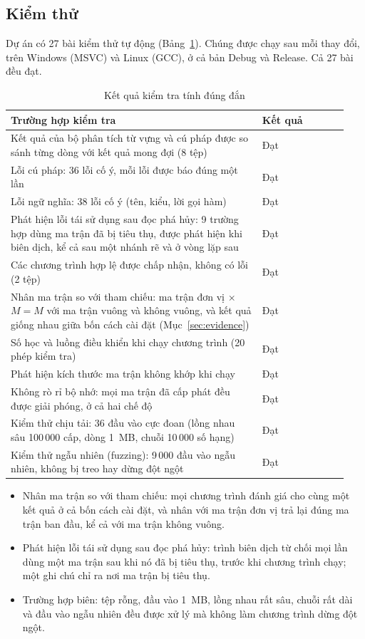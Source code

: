 \documentclass[a4paper]{article}
\begin{document}
	\subsection{Kiểm thử}

	Dự án có 27 bài kiểm thử tự động (Bảng~\ref{tab:verification}). Chúng được chạy sau mỗi thay đổi, trên Windows (MSVC) và Linux (GCC), ở cả bản Debug và Release. Cả 27 bài đều đạt.

	\begin{table}[h]
		\centering
		\caption{Kết quả kiểm tra tính đúng đắn}
		\label{tab:verification}
		\begin{tabular}{@{}>{\RaggedRight}p{0.70\linewidth} >{\RaggedRight}p{0.24\linewidth}@{}}
			\toprule
			Trường hợp kiểm tra & Kết quả \\
			\midrule
			Kết quả của bộ phân tích từ vựng và cú pháp được so sánh từng dòng với kết quả mong đợi (8 tệp) & Đạt \\
			Lỗi cú pháp: 36 lỗi cố ý, mỗi lỗi được báo đúng một lần & Đạt \\
			Lỗi ngữ nghĩa: 38 lỗi cố ý (tên, kiểu, lời gọi hàm) & Đạt \\
			Phát hiện lỗi tái sử dụng sau đọc phá hủy: 9 trường hợp dùng ma trận đã bị tiêu thụ, được phát hiện khi biên dịch, kể cả sau một nhánh rẽ và ở vòng lặp sau & Đạt \\
			Các chương trình hợp lệ được chấp nhận, không có lỗi (2 tệp) & Đạt \\
			Nhân ma trận so với tham chiếu: ma trận đơn vị $\times$ $M = M$ với ma trận vuông và không vuông, và kết quả giống nhau giữa bốn cách cài đặt (Mục~\ref{sec:evidence}) & Đạt \\
			Số học và luồng điều khiển khi chạy chương trình (20 phép kiểm tra) & Đạt \\
			Phát hiện kích thước ma trận không khớp khi chạy & Đạt \\
			Không rò rỉ bộ nhớ: mọi ma trận đã cấp phát đều được giải phóng, ở cả hai chế độ & Đạt \\
			Kiểm thử chịu tải: 36 đầu vào cực đoan (lồng nhau sâu 100\,000 cấp, dòng 1~MB, chuỗi 10\,000 số hạng) & Đạt \\
			Kiểm thử ngẫu nhiên (fuzzing): 9\,000 đầu vào ngẫu nhiên, không bị treo hay dừng đột ngột & Đạt \\
			\bottomrule
		\end{tabular}
	\end{table}

	\begin{itemize}
		\item Nhân ma trận so với tham chiếu: mọi chương trình đánh giá cho cùng một kết quả ở cả bốn cách cài đặt, và nhân với ma trận đơn vị trả lại đúng ma trận ban đầu, kể cả với ma trận không vuông.
		\item Phát hiện lỗi tái sử dụng sau đọc phá hủy: trình biên dịch từ chối mọi lần dùng một ma trận sau khi nó đã bị tiêu thụ, trước khi chương trình chạy; một ghi chú chỉ ra nơi ma trận bị tiêu thụ.
		\item Trường hợp biên: tệp rỗng, đầu vào 1~MB, lồng nhau rất sâu, chuỗi rất dài và đầu vào ngẫu nhiên đều được xử lý mà không làm chương trình dừng đột ngột.
	\end{itemize}
	
\end{document}
